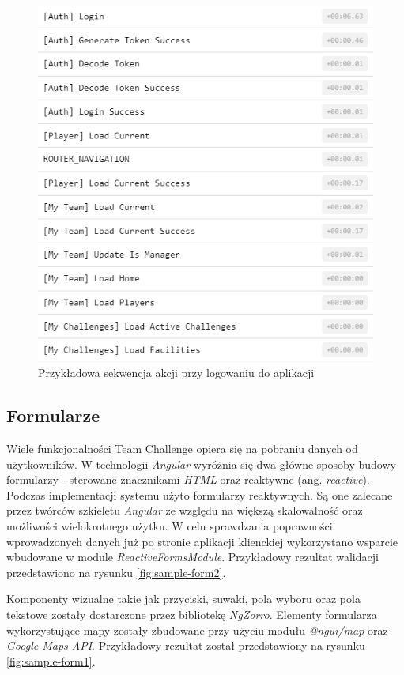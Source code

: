 \begin{figure}[H]
\centering
\includegraphics[width=0.45\linewidth]{06-implementacja/rys/actions.PNG}
\caption{Przykładowa sekwencja akcji przy logowaniu do aplikacji}
\label{fig:actions}
\end{figure}


\subsection{Formularze}

Wiele funkcjonalności Team Challenge opiera się na pobraniu danych od użytkowników. W technologii \textit{Angular} wyróżnia się dwa główne sposoby budowy formularzy - sterowane znacznikami \textit{HTML} oraz reaktywne (ang. \textit{reactive}). Podczas implementacji systemu użyto formularzy reaktywnych. Są one zalecane przez twórców szkieletu \textit{Angular} ze względu na większą skalowalność oraz możliwości wielokrotnego użytku. W celu sprawdzania poprawności wprowadzonych danych już po stronie aplikacji klienckiej wykorzystano wsparcie wbudowane w module \textit{ReactiveFormsModule}. Przykładowy rezultat walidacji przedstawiono na rysunku \ref{fig:sample-form2}.

Komponenty wizualne takie jak przyciski, suwaki, pola wyboru oraz pola tekstowe zostały dostarczone przez bibliotekę \textit{NgZorro}.  Elementy formularza wykorzystujące mapy zostały zbudowane przy użyciu modułu \textit{@ngui/map} oraz \textit{Google Maps API}. Przykładowy rezultat został przedstawiony na rysunku \ref{fig:sample-form1}.

